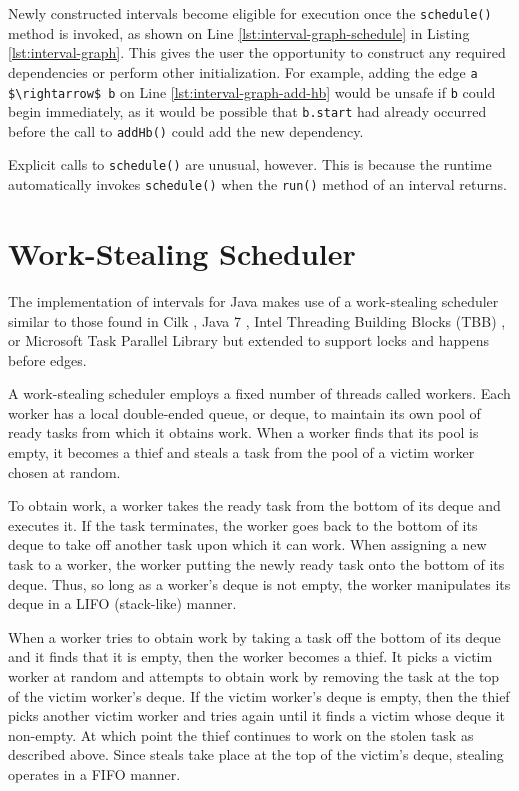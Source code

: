 Newly constructed intervals become eligible for execution once the
\lstinline|schedule()| method is invoked, as shown on Line
\ref{lst:interval-graph-schedule} in Listing
\ref{lst:interval-graph}. This gives the user the opportunity to
construct any required dependencies or perform other
initialization. For example, adding the edge
\lstinline|a $\rightarrow$ b| on Line \ref{lst:interval-graph-add-hb}
would be unsafe if \lstinline|b| could begin immediately, as it would
be possible that \lstinline|b.start| had already occurred before the
call to \lstinline|addHb()| could add the new dependency.

Explicit calls to \lstinline|schedule()| are unusual, however. This is
because the runtime automatically invokes \lstinline|schedule()| when
the \lstinline|run()| method of an interval returns.


\section{Work-Stealing Scheduler}
\label{sec:intro-work-stealing-scheduler}

The implementation of intervals for Java makes use of a work-stealing
scheduler similar to those found in Cilk \cite{Blumofe1995,
  Frigo1998}, Java 7 \cite{Lea2000, Lea2000a, Lea2004, Lea2006}, Intel
Threading Building Blocks (TBB) \cite{Reinders2007, Contreras2008}, or
Microsoft Task Parallel Library \cite{Leijen2009} but extended to
support locks and happens before edges.

A work-stealing scheduler employs a fixed number of threads called
workers. Each worker has a local double-ended queue, or deque, to
maintain its own pool of ready tasks from which it obtains work. When
a worker finds that its pool is empty, it becomes a thief and steals a
task from the pool of a victim worker chosen at random.

To obtain work, a worker takes the ready task from the bottom of its
deque and executes it. If the task terminates, the worker goes back to
the bottom of its deque to take off another task upon which it can
work. When assigning a new task to a worker, the worker putting the
newly ready task onto the bottom of its deque. Thus, so long as a
worker's deque is not empty, the worker manipulates its deque in a
LIFO (stack-like) manner.

When a worker tries to obtain work by taking a task off the bottom of
its deque and it finds that it is empty, then the worker becomes a
thief. It picks a victim worker at random and attempts to obtain work
by removing the task at the top of the victim worker's deque. If the
victim worker's deque is empty, then the thief picks another victim
worker and tries again until it finds a victim whose deque it
non-empty. At which point the thief continues to work on the stolen
task as described above. Since steals take place at the top of the
victim's deque, stealing operates in a FIFO manner.

